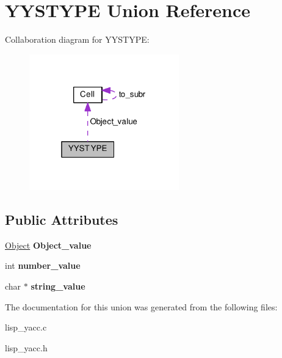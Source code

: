 \hypertarget{unionYYSTYPE}{\section{Y\-Y\-S\-T\-Y\-P\-E Union Reference}
\label{unionYYSTYPE}
}


Collaboration diagram for Y\-Y\-S\-T\-Y\-P\-E\-:\nopagebreak
\begin{figure}[H]
\begin{center}
\leavevmode
\includegraphics[width=184pt]{unionYYSTYPE__coll__graph}
\end{center}
\end{figure}
\subsection*{Public Attributes}
\begin{DoxyCompactItemize}
\item 
\hypertarget{unionYYSTYPE_ad89069baa0a35ece66a52b315835abe6}{\hyperlink{classCell}{Object} {\bfseries Object\-\_\-value}}\label{unionYYSTYPE_ad89069baa0a35ece66a52b315835abe6}

\item 
\hypertarget{unionYYSTYPE_a85e325a8c56800cb3c763fb0aae89b28}{int {\bfseries number\-\_\-value}}\label{unionYYSTYPE_a85e325a8c56800cb3c763fb0aae89b28}

\item 
\hypertarget{unionYYSTYPE_ac01a27ce7f2f4974d8b55b4ba00429a0}{char $\ast$ {\bfseries string\-\_\-value}}\label{unionYYSTYPE_ac01a27ce7f2f4974d8b55b4ba00429a0}

\end{DoxyCompactItemize}


The documentation for this union was generated from the following files\-:\begin{DoxyCompactItemize}
\item 
lisp\-\_\-yacc.\-c\item 
lisp\-\_\-yacc.\-h\end{DoxyCompactItemize}
